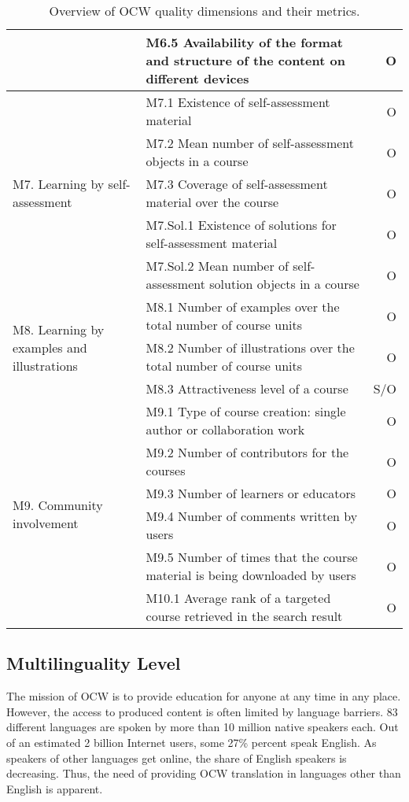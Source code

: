 \documentclass{sig-alternate}
\theoremstyle{definition}
\begin{document}
\begin{table*}[tb!]
\begin{tabular}{p{3.5cm}p{10.5cm}r}
& {\small M6.5 Availability of the format and structure of the content on different devices} & O \\
\hline
\multirow{5}{3cm}{M7. Learning by self-assessment} & {\small M7.1 Existence of self-assessment material} & O \\
& {\small M7.2 Mean number of self-assessment objects in a course} & O \\
& {\small M7.3 Coverage of self-assessment material over the course} & O \\
& {\small M7.Sol.1 Existence of solutions for self-assessment material} & O \\
& {\small M7.Sol.2 Mean number of self-assessment solution objects in a course} & O \\
\hline
\multirow{3}{3cm}{M8. Learning by examples and illustrations} & {\small M8.1 Number of examples over the total number of course units} & O \\
& {\small M8.2 Number of illustrations over the total number of course units} & O \\
& {\small M8.3 Attractiveness level of a course} & S/O \\
\hline
\multirow{6}{3cm}{M9. Community involvement} & {\small M9.1 Type of course creation: single author or collaboration work} & O \\
& {\small M9.2 Number of contributors for the courses} & O \\
& {\small M9.3 Number of learners or educators} & O \\
& {\small M9.4 Number of comments written by users} & O \\
& {\small M9.5 Number of times that the course material is being downloaded by users} & O \\
\hline
M10. Discoverability & {\small M10.1 Average rank of a targeted course retrieved in the search result} & O \\ \hline
\end{tabular}
\caption{Overview of OCW quality dimensions and their metrics.}
\label{tab:dimensions}
\end{table*}

\subsection{Multilinguality Level}
\label{sec:Multilinguality}
The mission of OCW is to provide education for anyone at any time in any place.
However, the access to produced content is often limited by language barriers.
83 different languages are spoken by more than 10 million native speakers each.
Out of an estimated 2 billion Internet users, some 27\% percent speak English.
As speakers of other languages get online, the share of English speakers is decreasing.
Thus, the need of providing OCW translation in languages other than English is apparent.
\end{document}
